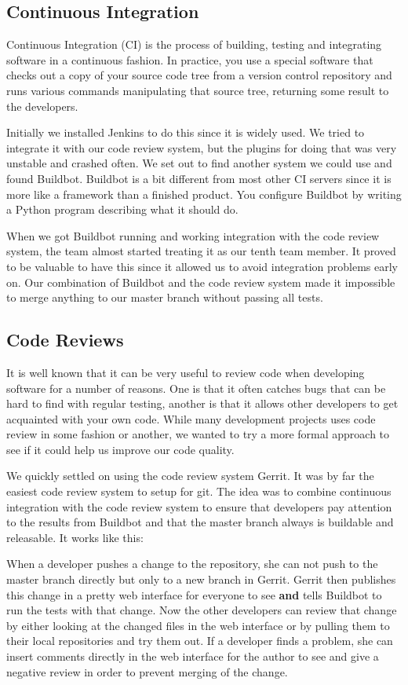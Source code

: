\documentclass[11pt,a4paper]{report}
\begin{document}
\subsection{Continuous Integration}
Continuous Integration (CI) is the process of building, testing and integrating
software in a continuous fashion. In practice, you use a special software that
checks out a copy of your source code tree from a version control repository and
runs various commands manipulating that source tree, returning some result to
the developers.

Initially we installed Jenkins to do this since it is widely used. We tried to
integrate it with our code review system, but the plugins for doing that was
very unstable and crashed often. We set out to find another system we could use
and found Buildbot. Buildbot is a bit different from most other CI servers since
it is more like a framework than a finished product. You configure Buildbot by
writing a Python program describing what it should do.

When we got Buildbot running and working integration with the code review
system, the team almost started treating it as our tenth team member. It proved
to be valuable to have this since it allowed us to avoid integration problems
early on. Our combination of Buildbot and the code review system made it
impossible to merge anything to our master branch without passing all tests.
\subsection{Code Reviews}
It is well known that it can be very useful to review code when developing
software for a number of reasons. One is that it often catches bugs that can be
hard to find with regular testing, another is that it allows other developers to
get acquainted with your own code. While many development projects uses code
review in some fashion or another, we wanted to try a more formal approach to
see if it could help us improve our code quality.

We quickly settled on using the code review system Gerrit. It was by far the
easiest code review system to setup for git. The idea was to combine continuous
integration with the code review system to ensure that developers pay attention
to the results from Buildbot and that the master branch always is buildable and
releasable. It works like this:

When a developer pushes a change to the repository, she can not push to the
master branch directly but only to a new branch in Gerrit. Gerrit then publishes
this change in a pretty web interface for everyone to see {\bf and} tells
Buildbot to run the tests with that change. Now the other developers can review
that change by either looking at the changed files in the web interface or by
pulling them to their local repositories and try them out. If a developer finds
a problem, she can insert comments directly in the web interface for the author
to see and give a negative review in order to prevent merging of the change.
\end{document}
